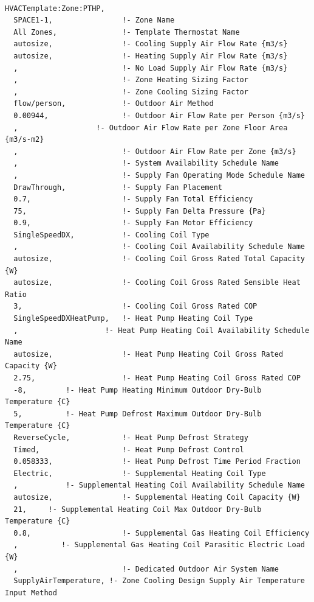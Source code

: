 \begin{lstlisting}

HVACTemplate:Zone:PTHP,
  SPACE1-1,                !- Zone Name
  All Zones,               !- Template Thermostat Name
  autosize,                !- Cooling Supply Air Flow Rate {m3/s}
  autosize,                !- Heating Supply Air Flow Rate {m3/s}
  ,                        !- No Load Supply Air Flow Rate {m3/s}
  ,                        !- Zone Heating Sizing Factor
  ,                        !- Zone Cooling Sizing Factor
  flow/person,             !- Outdoor Air Method
  0.00944,                 !- Outdoor Air Flow Rate per Person {m3/s}
  ,                  !- Outdoor Air Flow Rate per Zone Floor Area {m3/s-m2}
  ,                        !- Outdoor Air Flow Rate per Zone {m3/s}
  ,                        !- System Availability Schedule Name
  ,                        !- Supply Fan Operating Mode Schedule Name
  DrawThrough,             !- Supply Fan Placement
  0.7,                     !- Supply Fan Total Efficiency
  75,                      !- Supply Fan Delta Pressure {Pa}
  0.9,                     !- Supply Fan Motor Efficiency
  SingleSpeedDX,           !- Cooling Coil Type
  ,                        !- Cooling Coil Availability Schedule Name
  autosize,                !- Cooling Coil Gross Rated Total Capacity {W}
  autosize,                !- Cooling Coil Gross Rated Sensible Heat Ratio
  3,                       !- Cooling Coil Gross Rated COP
  SingleSpeedDXHeatPump,   !- Heat Pump Heating Coil Type
  ,                    !- Heat Pump Heating Coil Availability Schedule Name
  autosize,                !- Heat Pump Heating Coil Gross Rated Capacity {W}
  2.75,                    !- Heat Pump Heating Coil Gross Rated COP
  -8,         !- Heat Pump Heating Minimum Outdoor Dry-Bulb Temperature {C}
  5,          !- Heat Pump Defrost Maximum Outdoor Dry-Bulb Temperature {C}
  ReverseCycle,            !- Heat Pump Defrost Strategy
  Timed,                   !- Heat Pump Defrost Control
  0.058333,                !- Heat Pump Defrost Time Period Fraction
  Electric,                !- Supplemental Heating Coil Type
  ,           !- Supplemental Heating Coil Availability Schedule Name
  autosize,                !- Supplemental Heating Coil Capacity {W}
  21,     !- Supplemental Heating Coil Max Outdoor Dry-Bulb Temperature {C}
  0.8,                     !- Supplemental Gas Heating Coil Efficiency
  ,          !- Supplemental Gas Heating Coil Parasitic Electric Load {W}
  ,                        !- Dedicated Outdoor Air System Name
  SupplyAirTemperature, !- Zone Cooling Design Supply Air Temperature Input Method

\end{lstlisting}
